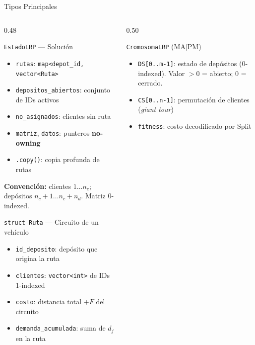 \documentclass[aspectratio=169,10pt]{beamer}
\newcommand{\tc}[1]{\texttt{\small #1}}
\begin{document}
\begin{frame}{Tipos Principales}
  \begin{columns}[T,onlytextwidth]
    \begin{column}{0.48\textwidth}
      \begin{block}{\tc{EstadoLRP} --- Solución}
        \footnotesize
        \begin{itemize}
          \item \tc{rutas}: \texttt{map<depot\_id, vector<Ruta>}
          \item \tc{depositos\_abiertos}: conjunto de IDs activos
          \item \tc{no\_asignados}: clientes sin ruta
          \item \tc{*matriz}, \tc{*datos}: punteros \textbf{no-owning}
          \item \tc{.copy()}: copia profunda de rutas
        \end{itemize}
        \vspace{0.1em}
        \textbf{Convención:} clientes $1\ldots n_c$;
        depósitos $n_c{+}1\ldots n_c{+}n_d$. Matriz 0-indexed.
      \end{block}
      \begin{block}{\tc{struct Ruta} --- Circuito de un vehículo}
        \footnotesize
        \begin{itemize}
          \item \tc{id\_deposito}: depósito que origina la ruta
          \item \tc{clientes}: \texttt{vector<int>} de IDs 1-indexed
          \item \tc{costo}: distancia total $+F$ del circuito
          \item \tc{demanda\_acumulada}: suma de $d_j$ en la ruta
        \end{itemize}
      \end{block}
    \end{column}
    \begin{column}{0.50\textwidth}
      \begin{block}{\tc{CromosomaLRP} (MA$|$PM)}
        \footnotesize
        \begin{itemize}
          \item \tc{DS[0..m-1]}: estado de depósitos (0-indexed).
                Valor $>0$ = abierto; 0 = cerrado.
          \item \tc{CS[0..n-1]}: permutación de clientes (\textit{giant tour})
          \item \tc{fitness}: costo decodificado por Split

\end{itemize}
\end{block}
\end{column}
\end{columns}
\end{frame}
\end{document}
